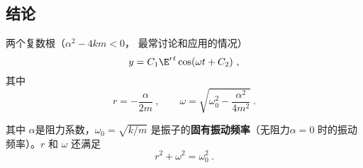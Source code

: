 
\subsection{结论}
两个复数根（$\alpha ^2 - 4km < 0$， 最常讨论和应用的情况）
\begin{equation}
y = C_1 \E^{rt} \cos(\omega t + C_2)~,
\end{equation}
其中
\begin{equation}
r =  - \frac{\alpha }{2m} ~,\qquad  \omega  = \sqrt{\omega_0^2 - \frac{\alpha ^2}{4 m^2}}~.
\end{equation}

其中 $\alpha$是阻力系数，$\omega_0 = \sqrt{k/m}$ 是振子的\textbf{固有振动频率}（无阻力$\alpha  = 0$ 时的振动频率）。$r$ 和 $\omega$ 还满足
\begin{equation}
r^2 + \omega ^2 = \omega_0^2~.
\end{equation}

